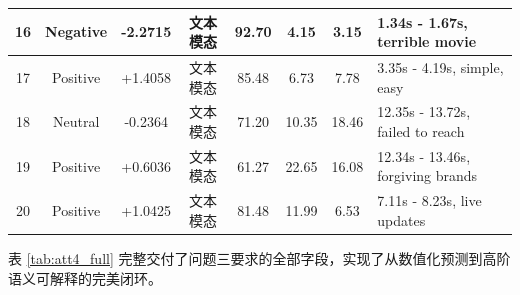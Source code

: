 \begin{table}[htp!]
\begin{tabularx}{\textwidth}{|c|c|c|c|c|c|c|X|}
16 & Negative & -2.2715 & 文本模态 & 92.70 & 4.15 & 3.15 & 1.34s - 1.67s, terrible movie \\ \hline
17 & Positive & +1.4058 & 文本模态 & 85.48 & 6.73 & 7.78 & 3.35s - 4.19s, simple, easy \\ \hline
18 & Neutral & -0.2364 & 文本模态 & 71.20 & 10.35 & 18.46 & 12.35s - 13.72s, failed to reach \\ \hline
19 & Positive & +0.6036 & 文本模态 & 61.27 & 22.65 & 16.08 & 12.34s - 13.46s, forgiving brands \\ \hline
20 & Positive & +1.0425 & 文本模态 & 81.48 & 11.99 & 6.53 & 7.11s - 8.23s, live updates \\ \hline
\end{tabularx}
\end{table}

表 \ref{tab:att4_full} 完整交付了问题三要求的全部字段，实现了从数值化预测到高阶语义可解释的完美闭环。

